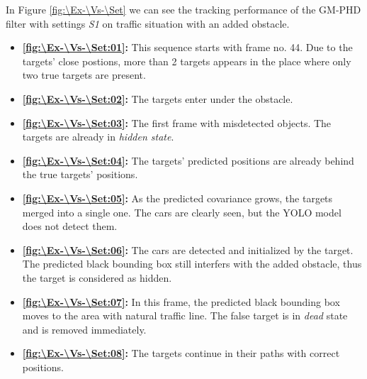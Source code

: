In Figure \ref{fig:\Ex-\Vs-\Set} we can see the tracking performance of the GM-PHD filter with settings \textit{S1} on traffic situation with an added obstacle.
\begin{itemize}
    \item \textbf{\ref{fig:\Ex-\Vs-\Set:01}:} This sequence starts with frame no. 44. Due to the targets' close postions, more than 2 targets appears in the place where only two true targets are present.
    \item \textbf{\ref{fig:\Ex-\Vs-\Set:02}:} The targets enter under the obstacle.
    \item \textbf{\ref{fig:\Ex-\Vs-\Set:03}:} The first frame with misdetected objects. The targets are already in \textit{hidden state}.
    \item \textbf{\ref{fig:\Ex-\Vs-\Set:04}:} The targets' predicted positions are already behind the true targets' positions.
    \item \textbf{\ref{fig:\Ex-\Vs-\Set:05}:} As the predicted covariance grows, the targets merged into a single one. The cars are clearly seen, but the YOLO model does not detect them.
    \item \textbf{\ref{fig:\Ex-\Vs-\Set:06}:} The cars are detected and initialized by the target. The predicted black bounding box still interfers with the added obstacle, thus the target is considered as hidden.
    \item \textbf{\ref{fig:\Ex-\Vs-\Set:07}:} In this frame, the predicted black bounding box moves to the area with natural traffic line. The false target is in \textit{dead} state and is removed immediately.
    \item \textbf{\ref{fig:\Ex-\Vs-\Set:08}:} The targets continue in their paths with correct positions.
\end{itemize}

